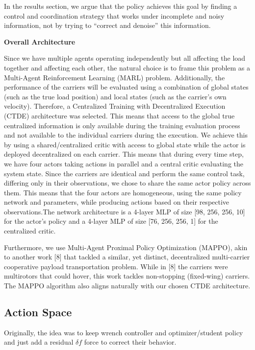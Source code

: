 In the results section, we argue that the policy achieves this goal by
finding a control and coordination strategy that works under incomplete
and noisy information, not by trying to “correct and denoise” this
information.

\noindent\textbf{Overall Architecture}

Since we have multiple agents operating independently but all affecting
the load together and affecting each other, the natural choice is to
frame this problem as a Multi-Agent Reinforcement Learning (MARL)
problem. Additionally, the performance of the carriers will be
evaluated using a combination of global states (such as the true load
position) and local states (such as the carrier’s own velocity). Therefore, a
Centralized Training with Decentralized Execution (CTDE) architecture
was selected. This means that access to the global true centralized
information is only available during the training evaluation process
and not available to the individual carriers during the execution. We
achieve this by using a shared/centralized critic with access to global
state while the actor is deployed decentralized on each carrier. This
means that during every time step, we have four actors taking actions
in parallel and a central critic evaluating the system state. Since the 
carriers are identical and perform the same
control task, differing only in their observations, we chose to share
the same actor policy across them. This means that the four actors are
homogeneous, using the same policy network and parameters, while
producing actions based on their respective observations.The network 
architecture is a 4-layer MLP of size [98, 256, 256, 10] for the actor's 
policy and a 4-layer MLP of size [76, 256, 256, 1] for the centralized critic.



Furthermore, we use Multi-Agent Proximal Policy Optimization (MAPPO),
akin to another work [8] that tackled a similar, yet distinct,
decentralized multi-carrier cooperative payload transportation problem.
While in [8] the carriers were multirotors that could hover, this work
tackles non-stopping (fixed-wing) carriers. The MAPPO algorithm also
aligns naturally with our chosen CTDE architecture.

\subsection{Action Space}

Originally, the idea was to keep wrench controller and optimizer/student
policy and
just add a residual $\delta f$ force to correct their behavior.

